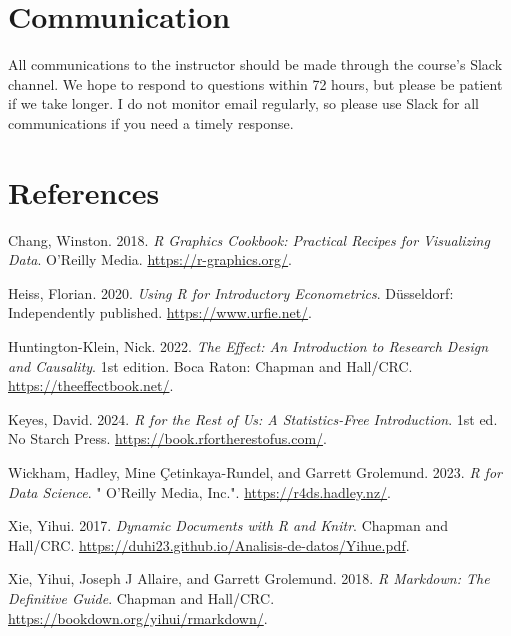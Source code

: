 \documentclass[
  letterpaper,
  DIV=11,
  numbers=noendperiod]{scrartcl}
\newlength{\cslhangindent}
\newenvironment{CSLReferences}[2] %
 {\begin{list}{}{%
  \setlength{\itemindent}{0pt}
  \setlength{\leftmargin}{0pt}
  \setlength{\parsep}{0pt}
  \ifodd #1
   \setlength{\leftmargin}{\cslhangindent}
   \setlength{\itemindent}{-1\cslhangindent}
  \fi
  \setlength{\itemsep}{#2\baselineskip}}}
 {\end{list}}
\begin{document}
\section{Communication}\label{communication}

All communications to the instructor should be made through the course's
Slack channel. We hope to respond to questions within 72 hours, but
please be patient if we take longer. I do not monitor email regularly,
so please use Slack for all communications if you need a timely
response.

\section*{References}\label{references}

\label{refs}
\begin{CSLReferences}{1}{0}
Chang, Winston. 2018. \emph{R Graphics Cookbook: Practical Recipes for
Visualizing Data}. O'Reilly Media. \url{https://r-graphics.org/}.

Heiss, Florian. 2020. \emph{Using {R} for {Introductory Econometrics}}.
Düsseldorf: Independently published. \url{https://www.urfie.net/}.

Huntington-Klein, Nick. 2022. \emph{The Effect: {An} Introduction to
Research Design and Causality}. 1st edition. Boca Raton: {Chapman and
Hall/CRC}. \url{https://theeffectbook.net/}.

Keyes, David. 2024. \emph{R for the {Rest} of {Us}: {A Statistics-Free
Introduction}}. 1st ed. No Starch Press.
\url{https://book.rfortherestofus.com/}.

Wickham, Hadley, Mine Çetinkaya-Rundel, and Garrett Grolemund. 2023.
\emph{R for Data Science}. " O'Reilly Media, Inc.".
\url{https://r4ds.hadley.nz/}.

Xie, Yihui. 2017. \emph{Dynamic Documents with {R} and Knitr}. {Chapman
and Hall/CRC}.
\url{https://duhi23.github.io/Analisis-de-datos/Yihue.pdf}.

Xie, Yihui, Joseph J Allaire, and Garrett Grolemund. 2018. \emph{R
Markdown: {The} Definitive Guide}. {Chapman and Hall/CRC}.
\url{https://bookdown.org/yihui/rmarkdown/}.

\end{CSLReferences}
\end{document}
